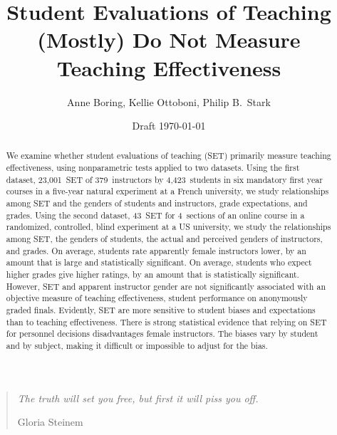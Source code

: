 \documentclass[12pt]{article}
\title{Student Evaluations of Teaching (Mostly) Do Not Measure Teaching Effectiveness}
\author{Anne Boring, Kellie Ottoboni, Philip B.~Stark}
\date{Draft \today}
\begin{document}
\maketitle

\newpage
\begin{quotation}
    \emph{The truth will set you free, but first it will piss you off.}
    
     \hfill Gloria Steinem

\begin{abstract}

We examine whether student evaluations of teaching (SET) 
primarily measure teaching effectiveness, using nonparametric tests applied
to two datasets. 
Using the first dataset, 23,001~SET of 379~instructors by 4,423~students in six 
mandatory first year courses in a five-year natural experiment at a French university, 
we study relationships among SET and the genders of students and instructors, 
grade expectations, and grades.
Using the second dataset, 43~SET for 4~sections of an online course in a randomized, controlled, 
blind experiment at a US university, 
we study the relationships among SET, the genders of students, 
the actual and perceived genders of instructors, and grades.
On average, students rate apparently female instructors lower, by an amount that is large and
statistically significant.
On average, students who expect higher grades give higher ratings, 
by an amount that is statistically significant.
However, SET and apparent instructor gender are not significantly associated 
with an objective measure of teaching effectiveness,
student performance on anonymously graded finals. 
Evidently, SET are more sensitive to student biases and expectations than to teaching 
effectiveness.
There is strong statistical evidence that relying on SET for 
personnel decisions disadvantages female instructors.
The biases vary by student and by subject, making it 
difficult or impossible to adjust for the bias. 



\end{abstract}
\end{quotation}
\end{document}
